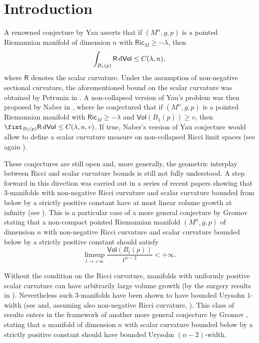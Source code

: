 \documentclass[10pt]{article}
\theoremstyle{definition}
\newcommand{\ssf}[1]{\mathsf{#1}}
\newcommand{\Ric}{\mathsf{Ric}}
\newcommand{\R}{\mathsf{R}}
\newcommand{\de}{{\rm d}}
\begin{document}
\section{Introduction}
A renowned conjecture  by Yau asserts that 
if $(M^n,g,p)$ is a pointed Riemannian manifold of dimension $n$ with $\Ric_M \geq - \lambda$, then 
\[
\int_{B_1(p)} \R \, \de \ssf{Vol} \leq C(\lambda,n),
\]
where $\R$ denotes the scalar curvature. Under the assumption of non-negative sectional curvature, the aforementioned bound on the scalar curvature was obtained by Petrunin in \cite{PetruninYau}. A non-collapsed version of Yau's problem was then proposed by Naber in \cite{Naberconjectures}, where he conjectured that if $(M^n,g,p)$ is a pointed Riemannian manifold with $\Ric_M \geq - \lambda$ and $\ssf{Vol}(B_1(p)) \geq v$, then $\fint_{B_1(p)} \R \, \de \ssf{Vol} \leq C(\lambda,n,v)$.
If true, Naber's version of Yau conjecture would allow to define a scalar curvature measure on non-collapsed Ricci limit spaces (see again \cite{Naberconjectures}).

These conjectures are still open and, more generally, the geometric interplay between Ricci and scalar curvature bounds is still not fully understood. 
A step forward in this direction was carried out in a series of recent papers
showing that $3$-manifolds with non-negative Ricci curvature and scalar curvature bounded from below by a strictly positive constant have at most linear volume growth at infinity (see \cite{wangvolumethreemanifolds, Chodoshvolumethreemanifolds}).
This is a particular case of a more general conjecture by Gromov  \cite{LargeGromov} stating that a non-compact pointed Riemannian manifold $(M^n,g,p)$ of dimension $n$ with non-negative Ricci curvature and scalar curvature bounded below by a strictly positive constant should satisfy
\begin{equation} \label{GVC}
\limsup_{t \to + \infty} \frac{ \ssf{Vol}(B_t(p))}{t^{n-2}} < + \infty.
\end{equation}

Without the condition on the Ricci curvature, manifolds with uniformly positive scalar curvature can have arbitrarily large volume growth (by the surgery results in \cite{GromovLawsonSurgery1,GromovLawsonSurgery2}).
Nevertheless such $3$-manifolds have been shown to have bounded Urysohn $1$-width (see \cite{Katzscalar,GromovScalar,Liokumovitchscalar,liokumovitchwang} and, assuming also non-negative Ricci curvature, \cite{ZhuGeometry}). This class of results enters in the framework of another more general conjecture by Gromov  \cite{GromovScalar}, stating that a manifold of dimension $n$ with scalar curvature bounded below by a strictly positive constant should have bounded Urysohn $(n-2)$-width.
\\
\end{document}

